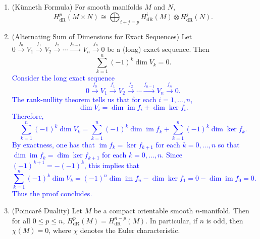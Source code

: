 \documentclass{article}
\newcommand{\expl}[1]{\textcolor{blue}{#1}}
\begin{document}
\begin{enumerate}
		\item (K\"unneth Formula) For smooth manifolds $M$ and $N$, 
		\begin{equation*}
			H^{p}_{\text{dR}}(M \times N) \cong \bigoplus_{i + j= p}H^{i}_{\text{dR}}(M) \otimes H^{j}_{\text{dR}}(N). 
		\end{equation*}
		
		\item (Alternating Sum of Dimensions for Exact Sequences) Let $0 \xrightarrow{f_{0}} V_{1} \xrightarrow{f_{1}} V_{2} \xrightarrow{f_{2}} \dotsm \xrightarrow{f_{n - 1}} V_{n} \xrightarrow{f_{n}} 0$ be a (long) exact sequence. Then 
		\begin{equation*}
			\sum_{k = 1}^{n}(-1)^{k}\dim{V_{k}} = 0. 
		\end{equation*}
		\expl{
		Consider the long exact sequence  
		\begin{equation*}
			0 \xrightarrow{f_{0}} V_{1} \xrightarrow{f_{1}} V_{2} \xrightarrow{f_{2}} \dotsm \xrightarrow{f_{n-1}} V_{n} \xrightarrow{f_{n}} 0. 
		\end{equation*}
		The rank-nullity theorem tells us that for each $i = 1, \ldots, n$, 
		\begin{equation*}
			\dim{V_{i}} = \dim{\operatorname{im}{f_{i}}} + \dim{\operatorname{ker}{f_{i}}}. 
		\end{equation*}
		Therefore, 
		\begin{equation*}
			\sum_{k = 1}^{n}(-1)^{k}\dim{V_{k}} = \sum_{k = 1}^{n}(-1)^{k}\dim{\operatorname{im}{f_{k}}} + \sum_{k = 1}^{n}(-1)^{k}\dim{\ker{f_{k}}}. 
		\end{equation*}
		By exactness, one has that $\operatorname{im}{f_{k}} = \ker{f_{k + 1}}$ for each $k = 0, \ldots, n$ so that $\dim{\operatorname{im}{f_{k}}} = \dim{\ker{f_{k + 1}}}$ for each $k = 0, \ldots, n$. Since $(-1)^{k + 1} = -(-1)^{k}$, this implies that 
		\begin{equation*}
			\sum_{k = 1}^{n}(-1)^{k}\dim{V_{k}} = (-1)^{n}\dim{\operatorname{im}{f_{n}}} - \dim{\ker{f_{1}}} = 0 - \dim{\operatorname{im}{f_{0}}} = 0.  
		\end{equation*}
		Thus the proof concludes. 
	}
	\item (Poincar\'e Duality) Let $M$ be a compact orientable smooth $n$-manifold. Then for all $0 \leq p \leq n$, $H^{p}_{\text{dR}}(M) = H^{n -p}_{\text{dR}}(M)$. In particular, if $n$ is odd, then $\chi(M) = 0$, where $\chi$ denotes the Euler characteristic. 
	\end{enumerate}
\end{document}
